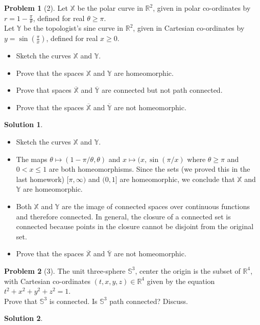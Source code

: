 \documentclass{article}
\theoremstyle{definition}
\newtheorem*{soln}{Solution}
\newtheorem*{prob}{Problem}
\theoremstyle{theorem}
\newcommand{\X}{\mathbb{X}}
\newcommand{\Y}{\mathbb{Y}}
\begin{document}
\begin{prob}[2]
Let $\mathbb{X}$ be the polar curve in $\mathbb{R}^2$, given in polar co-ordinates by $\displaystyle{r = 1 - \frac{\pi}{\theta}}$, defined for real $\theta \ge \pi$.  \\Let $\mathbb{Y}$ be the topologist's sine curve in $\mathbb{R}^2$, given in Cartesian co-ordinates by  $\displaystyle{y = \sin\left(\frac{\pi}{x}\right)}$, defined for real $x\ge 0$.  
\begin{itemize}\item Sketch the curves $\mathbb{X}$ and $\mathbb{Y}$.
\item Prove that the spaces   $\mathbb{X}$ and $\mathbb{Y}$ are homeomorphic.
\item Prove that spaces $\overline{\mathbb{X}}$ and $\overline{\mathbb{Y}}$ are connected but not path connected.
\item Prove that the spaces $\overline{\mathbb{X}}$ and $\overline{\mathbb{Y}}$ are not homeomorphic.
\end{itemize}
\end{prob}
\begin{soln}
\begin{itemize}\item Sketch the curves $\mathbb{X}$ and $\mathbb{Y}$.
        \item The maps $\theta \mapsto (1-\pi/\theta, \theta)$ and $x \mapsto (x,\sin(\pi/x)$ where $\theta\geq \pi$ and $0<x\leq 1$ are both homeomorphisms. Since the sets (we proved this in the last homework) $[\pi,\infty)$ and $(0,1]$ are homeomorphic, we conclude that $\X$ and $\Y$ are homeomorphic.
\item Both $\X$ and $\Y$ are the image of connected spaces over continuous functions and therefore connected. In general, the closure of a connected set is connected because points in the closure cannot be disjoint from the original set. 

\item Prove that the spaces $\overline{\mathbb{X}}$ and $\overline{\mathbb{Y}}$ are not homeomorphic.
\end{itemize}

\end{soln}
\vspace{1in}


\begin{prob}[3]
The unit three-sphere $\mathbb{S}^3$, center the origin is the subset of $\mathbb{R}^4$, with Cartesian co-ordinates $(t, x, y, z) \in \mathbb{R}^4$ given by the equation $t^2 + x^2 + y^2 + z^2 = 1$.  \\Prove that $\mathbb{S}^3$ is connected.  Is $\mathbb{S}^3$ path connected?  Discuss.
\end{prob}
\begin{soln}

\end{soln}
\vspace{1in}
\end{document}
